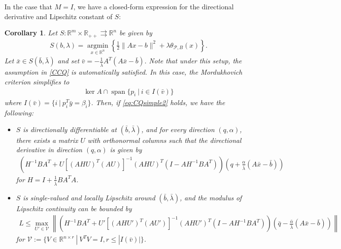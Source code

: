 \documentclass[reqno]{amsart}
\newtheorem{corollary}[proposition]{Corollary}
\numberwithin{equation}{section}
\newcommand{\R}{\mathbb{R}}
\newcommand{\tpb}{\theta_{\mathcal{P},B}}
\newcommand{\x}{\bar{x}}
\newcommand{\argmin}{\operatorname{argmin}}
\begin{document}
In the case that $M = I$, we have a closed-form 
expression for the directional derivative and Lipschitz constant of $S$:
\begin{corollary}\label{cor:Quant}
    Let $S : \R^m \times \R_{++} \rightrightarrows \R^n$ be given by \begin{align*}
        S(b, \lambda) = \underset{x \in \R^n}{\argmin} \left\{ \frac{1}{2} \lVert Ax - b \rVert^2 + \lambda \tpb(x) \right\}.
    \end{align*}
    Let $\bar x \in S(\bar b, \bar \lambda)$ and set $\bar v = - \frac{1}{\bar \lambda}A^T(A\x - \bar b)$. Note that under this setup, the assumption in \eqref{CCQ} is automatically satisfied. In this case, the Mordukhovich criterion simplifies to \begin{align}\label{eq:CQsimple2}
        \ker A \cap \operatorname{span}\{p_i \ | \ i \in I(\bar{v})\}
    \end{align}
    where $I(\bar{v}) = \{i \ | \ p_i^T \bar y  = \beta_i\}$. 
    Then, if \eqref{eq:CQsimple2}  holds, we have the following:
    \begin{itemize}
        \item[(i)] $S$ is directionally differentiable at $(\bar{b}, \bar{\lambda})$, and for every direction $(q, \alpha)$, there exists a matrix $U$ with orthonormal columns such that the directional derivative in direction $(q, \alpha)$ is given by
        \begin{align*}
            (H^{-1}BA^T + U[(AHU)^T (AU)]^{-1} (AHU)^{T} (I - AH^{-1}BA^T)) \left(q + \frac{\alpha}{\bar{\lambda}}(A \bar{x} - \bar{b})\right)
        \end{align*} for $H = I + \frac{1}{\bar \lambda} BA^TA$.
        \item[(ii)] $S$ is single-valued and locally Lipschitz around $(\bar{b}, \bar{\lambda})$, and the modulus of Lipschitz continuity can be bounded by
        {\small  \begin{align*}
            L \le \max_{U' \in \mathcal{V}} 
    \left\lVert (H^{-1}BA^T + U'[(AH U')^T (AU')]^{-1} (AH U')^{T} (I - AH^{-1}BA^T)) \left(\bar q - \frac{\bar \alpha}{\bar \lambda}(A \bar x - \bar b)\right) \right\rVert
        \end{align*}}
        for  $\mathcal{V}:=\{V\in \R^{n\times r} \ | \ V^TV=I, r\le |I(\bar v)|\}$.
    \end{itemize}
\end{corollary}
\end{document}
